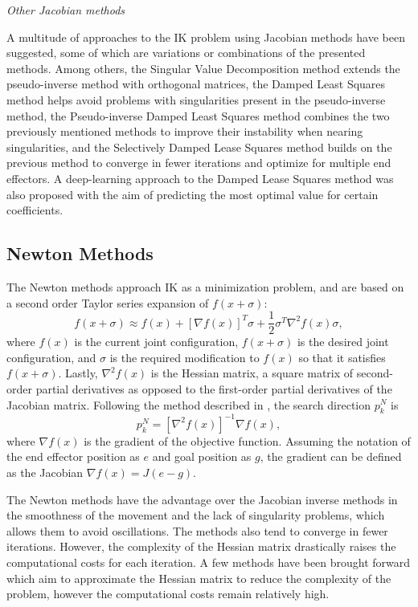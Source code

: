 \noindent\textit{Other Jacobian methods}

A multitude of approaches to the IK problem using Jacobian methods have been
suggested, some of which are variations or combinations of the presented
methods. Among others, the Singular Value Decomposition method \cite{num_recipes}
extends the pseudo-inverse method with orthogonal matrices, the Damped
Least Squares method \cite{Wampler1986ManipulatorIK} helps avoid problems with
singularities present in the pseudo-inverse method, the Pseudo-inverse Damped
Least Squares method \cite{maciejewski, num_recipes} combines the two previously
mentioned methods to improve their instability when nearing singularities, and
the Selectively Damped Lease Squares method \cite{buss_kim_sdls} builds on the
previous method to converge in fewer iterations and optimize for multiple end
effectors. A deep-learning approach to the Damped Lease Squares method was also
proposed \cite{wang_dldls} with the aim of predicting the most optimal value for
certain coefficients.

\subsection{Newton Methods}
The Newton methods approach IK as a minimization problem, and are based on
a second order Taylor series expansion of \(f(x + \sigma)\):
\begin{equation}
    f(x + \sigma) \approx f(x) + [\nabla f(x)]^T \sigma + \frac{1}{2} \sigma^T
    \nabla^2 f(x) \sigma,
\end{equation}
where \(f(x)\) is the current joint configuration, \(f(x + \sigma)\)
is the desired joint configuration, and \(\sigma\) is the required modification to
\(f(x)\) so that it satisfies \(f(x + \sigma)\). Lastly, \(\nabla^2 f(x)\) is
the Hessian matrix, a square matrix of second-order partial derivatives as
opposed to the first-order partial derivatives of the Jacobian matrix. Following
the method described in \cite{nocedal_newton}, the search direction \(p^N_k\) is
\begin{equation}
    p^N_k = [\nabla^2 f(x)]^{-1} \nabla f(x),
\end{equation}
where \(\nabla f(x)\) is the gradient of the objective function.
Assuming the notation of the end effector position as \(e\) and goal position as
\(g\), the gradient can be defined as the Jacobian \(\nabla f(x) = J(e - g)\).

The Newton methods have the advantage over the Jacobian inverse methods in the
smoothness of the movement and the lack of singularity problems, which allows
them to avoid oscillations. The methods also tend to converge
in fewer iterations. However, the complexity of the Hessian matrix drastically
raises the computational costs for each iteration. A few methods have been
brought forward which aim to approximate the Hessian matrix to reduce the
complexity of the problem, however the computational costs remain relatively
high. 

